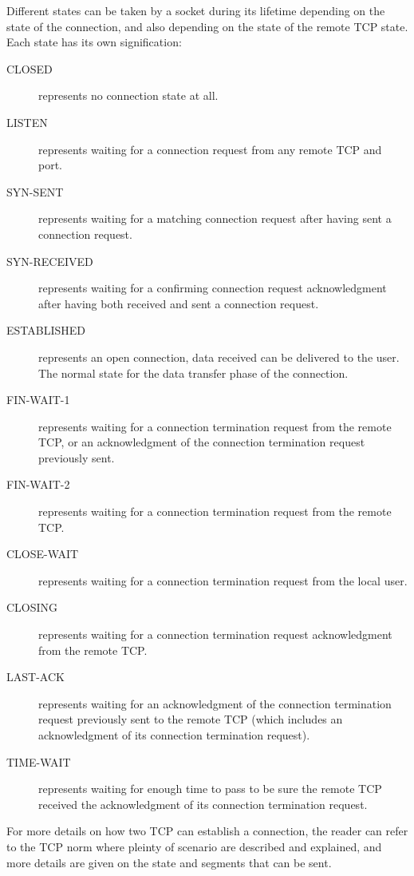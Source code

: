 \documentclass[a4paper, 10pt]{article}
\begin{document}
    Different states can be taken by a socket during its lifetime depending on the state
    of the connection, and also depending on the state of the remote TCP state. Each
    state has its own signification:
    \begin{description}
        \item[CLOSED] represents no connection state at all.
        \item[LISTEN] represents waiting for a connection request from any remote
        TCP and port.
        \item[SYN-SENT] represents waiting for a matching connection request
        after having sent a connection request.
        \item[SYN-RECEIVED] represents waiting for a confirming connection
        request acknowledgment after having both received and sent a
        connection request.
        \item[ESTABLISHED] represents an open connection, data received can be
        delivered to the user. The normal state for the data transfer phase
        of the connection.
        \item[FIN-WAIT-1] represents waiting for a connection termination request
        from the remote TCP, or an acknowledgment of the connection
        termination request previously sent.
        \item[FIN-WAIT-2] represents waiting for a connection termination request
        from the remote TCP.
        \item[CLOSE-WAIT] represents waiting for a connection termination request
        from the local user.
        \item[CLOSING] represents waiting for a connection termination request
        acknowledgment from the remote TCP.
        \item[LAST-ACK] represents waiting for an acknowledgment of the
        connection termination request previously sent to the remote TCP
        (which includes an acknowledgment of its connection termination
        request).
        \item[TIME-WAIT] represents waiting for enough time to pass to be sure
        the remote TCP received the acknowledgment of its connection
        termination request.
    \end{description}

    For more details on how two TCP can establish a connection, the reader can refer
    to the TCP norm where pleinty of scenario are described and explained, and more
    details are given on the state and segments that can be sent.
\end{document}
